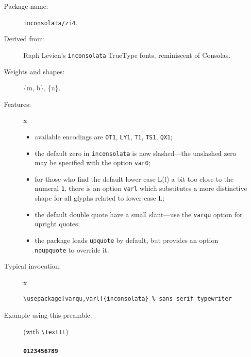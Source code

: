 \documentclass{article}
\begin{document}
\begin{description}
\item[Package name:] {\tt inconsolata/zi4}.
\item[Derived from:] Raph Levien's {\tt inconsolata} TrueType fonts, reminiscent of Consolas.
\item[Weights and shapes:]  \{m, b\}, \{n\}. 
\item[Features:]{\color{white}x}\\[-16pt]  
\begin{itemize}
\item available encodings are {\tt OT1}, {\tt LY1}, {\tt T1}, {\tt TS1}, {\tt QX1};\item
the default zero in {\tt inconsolata} is now slashed---the unslashed zero may be specified with the option {\tt var0};
\item for those who find the default lower-case L({\zifourzero l}) a bit too close to the numeral {\tt 1}, there is an option {\tt varl} which substitutes a more distinctive shape for all glyphs related to lower-case L;
\item the default double quote have a small slant---use
the {\tt varqu} option for upright quotes; 
\item the package loads {\tt upquote} by default, but provides an option {\tt noupquote} to override it.
\end{itemize}
\item[Typical invocation:]{\color{white}x}
\begin{verbatim}
\usepackage[varqu,varl]{inconsolata} % sans serif typewriter
\end{verbatim}
\item[Example using this preamble:] (with \verb|\texttt|)\\[6pt]
\texttt{\\
\textbf{0123456789}}
\newpage
\hypertarget{lnk:zlmtt}{}

\end{description}
\end{document}
